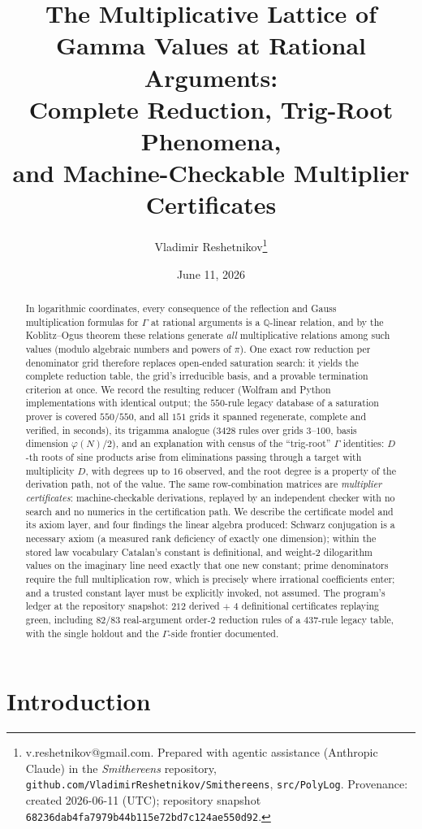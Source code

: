\documentclass[11pt]{article}
\title{The Multiplicative Lattice of Gamma Values at Rational Arguments:\\
Complete Reduction, Trig-Root Phenomena,\\ and Machine-Checkable Multiplier Certificates}
\author{Vladimir Reshetnikov\thanks{%
v.reshetnikov@gmail.com. Prepared with agentic assistance (Anthropic Claude) in the
\emph{Smithereens} repository,
\texttt{github.com/VladimirReshetnikov/Smithereens}, \texttt{src/PolyLog}.
Provenance: created 2026-06-11 (UTC); repository snapshot
\texttt{68236dab4fa7979b44b115e72bd7c124ae550d92}.}}
\date{June 11, 2026}
\theoremstyle{remark}
\begin{document}
\maketitle

\begin{abstract}
In logarithmic coordinates, every consequence of the reflection and Gauss multiplication
formulas for $\Gamma$ at rational arguments is a $\mathbb{Q}$-linear relation, and by the
Koblitz--Ogus theorem these relations generate \emph{all} multiplicative relations among such
values (modulo algebraic numbers and powers of $\pi$). One exact row reduction per
denominator grid therefore replaces open-ended saturation search: it yields the complete
reduction table, the grid's irreducible basis, and a provable termination criterion at once.
We record the resulting reducer (Wolfram and Python implementations with identical output;
the $550$-rule legacy database of a saturation prover is covered $550/550$, and all $151$
grids it spanned regenerate, complete and verified, in seconds), its trigamma analogue
($3428$ rules over grids $3$--$100$, basis dimension $\varphi(N)/2$), and an explanation
with census of the ``trig-root'' $\Gamma$ identities: $D$-th roots of sine products arise
from eliminations passing through a target with multiplicity $D$, with degrees up to $16$
observed, and the root degree is a property of the derivation path, not of the value. The
same row-combination matrices are \emph{multiplier certificates}: machine-checkable
derivations, replayed by an independent checker with no search and no numerics in the
certification path. We describe the certificate model and its axiom layer, and four
findings the linear algebra produced: Schwarz conjugation is a necessary axiom (a measured
rank deficiency of exactly one dimension); within the stored law vocabulary Catalan's
constant is definitional, and weight-2 dilogarithm values on the imaginary line need
exactly that one new constant; prime denominators require the full multiplication row,
which is precisely where irrational coefficients enter; and a trusted constant layer must
be explicitly invoked, not assumed. The program's ledger at the repository snapshot: $212$
derived $+$ $4$ definitional certificates replaying green, including $82/83$ real-argument
order-2 reduction rules of a $437$-rule legacy table, with the single holdout and the
$\Gamma$-side frontier documented.
\end{abstract}

\section{Introduction}\label{sec:intro}
\end{document}
